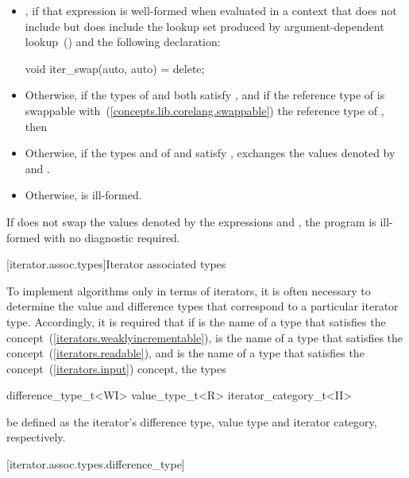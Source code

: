 \begin{itemize}
\item {}, if that expression is well-formed when
evaluated in a context that does not include  but does
include the lookup set produced by argument-dependent
lookup~() and the following declaration:
\begin{codeblock}
void iter_swap(auto, auto) = delete;
\end{codeblock}
\item Otherwise, if the types of  and  both satisfy
, and if the reference type of  is swappable
with~(\ref{concepts.lib.corelang.swappable}) the reference type of ,
then 
\item Otherwise, if the types  and  of  and
 satisfy , exchanges the values denoted by
 and .
\item Otherwise,  is ill-formed.
\end{itemize}

\pnum
If  does not swap the values denoted by the
expressions  and , the program is ill-formed with no
diagnostic required.

[iterator.assoc.types]{Iterator associated types}

\pnum
To implement algorithms only in terms of iterators, it is often necessary to
determine the value and
difference types that correspond to a particular iterator type.
Accordingly, it is required that if
 is the name of a type that
satisfies the  concept~(\ref{iterators.weaklyincrementable}),
 is the name of a type that
satisfies the  concept~(\ref{iterators.readable}), and
 is the name of a type that satisfies the
 concept~(\ref{iterators.input}) concept, the types

\begin{codeblock}
difference_type_t<WI>
value_type_t<R>
iterator_category_t<II>
\end{codeblock}

be defined as the iterator's difference type, value type and iterator category, respectively.

[iterator.assoc.types.difference_type]{}

